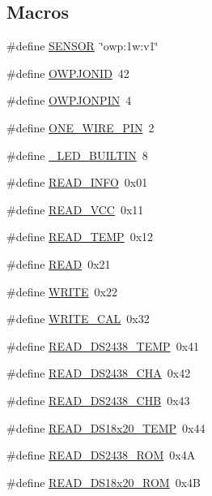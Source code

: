 \subsection*{Macros}
\begin{DoxyCompactItemize}
\item 
\#define \hyperlink{OWP__DG__1w-adaptor_8ino_a84f1ead330bbcc83a63929c4726080d7}{S\-E\-N\-S\-O\-R}~\char`\"{}owp\-:1w\-:v1\char`\"{}
\item 
\#define \hyperlink{OWP__DG__1w-adaptor_8ino_aff6283040066cbe0e6d17cbcd83abffc}{O\-W\-P\-J\-O\-N\-I\-D}~42
\item 
\#define \hyperlink{OWP__DG__1w-adaptor_8ino_a56e661b1bfea8fcdd1bc25c6cdfe2a73}{O\-W\-P\-J\-O\-N\-P\-I\-N}~4
\item 
\#define \hyperlink{OWP__DG__1w-adaptor_8ino_a394c6366a35129c8aece2e331c3263d5}{O\-N\-E\-\_\-\-W\-I\-R\-E\-\_\-\-P\-I\-N}~2
\item 
\#define \hyperlink{OWP__DG__1w-adaptor_8ino_a35be658482f544255f771c4c69982391}{\-\_\-\-L\-E\-D\-\_\-\-B\-U\-I\-L\-T\-I\-N}~8
\item 
\#define \hyperlink{OWP__DG__1w-adaptor_8ino_ae9d85efda88bdfdba5ca9fe92f557dd9}{R\-E\-A\-D\-\_\-\-I\-N\-F\-O}~0x01
\item 
\#define \hyperlink{OWP__DG__1w-adaptor_8ino_a3563b296d5f60635a1256e8a12261d74}{R\-E\-A\-D\-\_\-\-V\-C\-C}~0x11
\item 
\#define \hyperlink{OWP__DG__1w-adaptor_8ino_ac8c23082885adeec4834469b64e00bb9}{R\-E\-A\-D\-\_\-\-T\-E\-M\-P}~0x12
\item 
\#define \hyperlink{OWP__DG__1w-adaptor_8ino_ada74e7db007a68e763f20c17f2985356}{R\-E\-A\-D}~0x21
\item 
\#define \hyperlink{OWP__DG__1w-adaptor_8ino_aa10f470e996d0f51210d24f442d25e1e}{W\-R\-I\-T\-E}~0x22
\item 
\#define \hyperlink{OWP__DG__1w-adaptor_8ino_a9418b096dba157494f523dc01b82a760}{W\-R\-I\-T\-E\-\_\-\-C\-A\-L}~0x32
\item 
\#define \hyperlink{OWP__DG__1w-adaptor_8ino_a7dda9dd96643c5e273bce5f237f6c3c9}{R\-E\-A\-D\-\_\-\-D\-S2438\-\_\-\-T\-E\-M\-P}~0x41
\item 
\#define \hyperlink{OWP__DG__1w-adaptor_8ino_a63f32f386170e4065b5fdd7a1a8521cf}{R\-E\-A\-D\-\_\-\-D\-S2438\-\_\-\-C\-H\-A}~0x42
\item 
\#define \hyperlink{OWP__DG__1w-adaptor_8ino_a0cc83db22607312d835fd8da13968847}{R\-E\-A\-D\-\_\-\-D\-S2438\-\_\-\-C\-H\-B}~0x43
\item 
\#define \hyperlink{OWP__DG__1w-adaptor_8ino_a4e819c3b3fde201781ca4a9a1797c188}{R\-E\-A\-D\-\_\-\-D\-S18x20\-\_\-\-T\-E\-M\-P}~0x44
\item 
\#define \hyperlink{OWP__DG__1w-adaptor_8ino_a755ae07d8f76c19ddc3d8b1cc3a753c2}{R\-E\-A\-D\-\_\-\-D\-S2438\-\_\-\-R\-O\-M}~0x4\-A
\item 
\#define \hyperlink{OWP__DG__1w-adaptor_8ino_a7ca8c60e0479524189c52f6179a18244}{R\-E\-A\-D\-\_\-\-D\-S18x20\-\_\-\-R\-O\-M}~0x4\-B
\end{DoxyCompactItemize}
